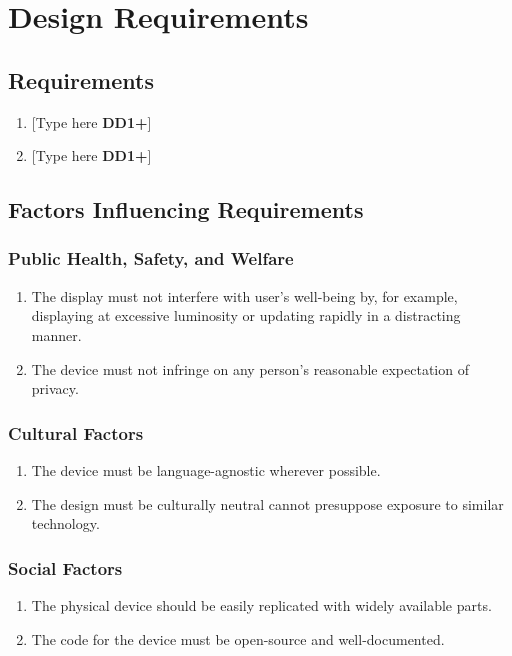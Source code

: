 \clearpage
\section{Design Requirements}
\subsection{Requirements}
\begin{enumerate}
    \item {[Type here \textbf{DD1+}]}
    \item {[Type here \textbf{DD1+}]}
\end{enumerate}

\clearpage

\subsection{Factors Influencing Requirements}
\subsubsection{Public Health, Safety, and Welfare}
\begin{enumerate}
    \item The display must not interfere with
          user's well-being by, for example, displaying at
          excessive luminosity or updating rapidly
          in a distracting manner.
    \item The device must not infringe on any person's
          reasonable expectation of privacy.
\end{enumerate}

\subsubsection{Cultural Factors}
\begin{enumerate}
    \item The device must
          be language-agnostic wherever possible.
    \item The design must be culturally neutral
          cannot presuppose exposure to similar
          technology.
\end{enumerate}

\subsubsection{Social Factors}
\begin{enumerate}
    \item The physical device should be
          easily replicated with widely available
          parts.
    \item The code for the device must
          be open-source and well-documented.
\end{enumerate}

